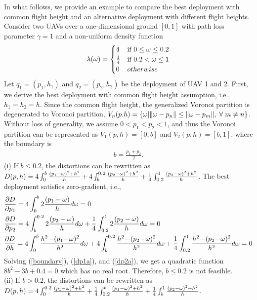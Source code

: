 \documentclass[smallabstract,smallcaptions]{dccpaper}
\newcounter{example}[section]
\begin{document}
In what follows, we provide an example to compare the best deployment with common flight height and an alternative
deployment with different flight heights.  Consider two UAVs over a one-dimensional ground $[0,1]$ with path loss
parameter $\gamma=1$ and a non-uniform density function 
%
\begin{align}
    \lambda(\omega) = 
    \begin{cases}
        4 & \text{if } 0\le\omega\le0.2\\
        \frac{1}{4} & \text{if } 0.2<\omega\le1\\
        0 & otherwise
    \end{cases}
\end{align}
%
Let $q_1=\left(p_1, h_1\right)$ and $q_2=\left(p_2, h_2\right)$ be the deployment of UAV 1 and 2.
First, we derive the best deployment with common flight height assumption, i.e., $h_1=h_2=h$.
Since the common flight height, the generalized Voronoi partition is degenerated to Voronoi partition, $V_n(p. h)=\{\ome|\|\ome-p_n\|\le\|\ome-p_m\|, \forall m\ne n\}$.
Without loss of generality, we assume $0<p_1<p_2<1$, and thus the Voronoi partition can be represented as $V_1(p, h) = [0, b]$ and $V_2(p, h) = [b, 1]$, where the boundary is 
\begin{align}
b = \frac{p_1+p_2}{2}.\label{boundary}
\end{align}
(i) If $b\le0.2$, the distortions can be rewritten as $D(p,h)=4\int_{0}^{b}\frac{(p_1-\omega)^2+h^2}{h}+4\int_{b}^{0.2}\frac{(p_2-\omega)^2+h^2}{h} + \frac{1}{4}\int_{0.2}^{1}\frac{(p_2-\omega)^2+h^2}{h}$. 
The best deployment satisfies zero-gradient, i.e.,
\begin{align}
    &\frac{\partial D}{\partial p_1} = 4\int_{0}^{b}2\frac{(p_1-\ome)}{h}d\ome=0 \label{dp1a}\\
    &\frac{\partial D}{\partial p_2} = 4\int_{b}^{0.2}2\frac{(p_2-\ome)}{h}d\ome
    + \frac{1}{4}\int_{0.2}^{1}2\frac{(p_2-\ome)}{h}d\ome = 0\label{dp2a}\\
    &\frac{\partial D}{\partial h} = 4\int_{0}^{b}\frac{h^2\!-\!(p_1\!-\!\ome)^2}{h^2}d\ome 
    + 4\int_{b}^{0.2}\frac{h^2\!-\!(p_2\!-\!\ome)^2}{h^2}d\ome 
    + \frac{1}{4}\int_{0.2}^1\frac{h^2\!-\!(p_2\!-\!\ome)^2}{h^2}d\ome= 0\notag
\end{align}
Solving (\ref{boundary}), (\ref{dp1a}), and (\ref{dp2a}), we get a quadratic function $8b^2-3b+0.4=0$ which has no real root.
Therefore, $b\le0.2$ is not feasible.\\
(ii) If $b>0.2$, the distortions can be rewritten as
$D(p,h)=4\int_{0}^{0.2}\frac{(p_1-\omega)^2+h^2}{h}+\frac{1}{4}\int_{0.2}^{b}\frac{(p_1-\omega)^2+h^2}{h} + \frac{1}{4}\int_{b}^{1}\frac{(p_2-\omega)^2+h^2}{h}$. 
\end{document}
